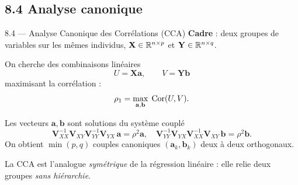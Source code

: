 \subsection{8.4 Analyse canonique}
\begin{frame}{8.4 — Analyse Canonique des Corrélations (CCA)}
\textbf{Cadre} : deux groupes de variables sur les mêmes individus,
$\mathbf{X} \in \mathbb{R}^{n \times p}$ et $\mathbf{Y} \in \mathbb{R}^{n \times q}$.

\begin{definition}
On cherche des combinaisons linéaires
\[
U = \mathbf{X}\mathbf{a}, \qquad V = \mathbf{Y}\mathbf{b}
\]
maximisant la \alert{corrélation} :
\[
\rho_1 = \max_{\mathbf{a}, \mathbf{b}}\; \operatorname{Cor}(U, V).
\]
\end{definition}

\begin{theorem}[Solution]
Les vecteurs $\mathbf{a}, \mathbf{b}$ sont solutions du système couplé
\[
\mathbf{V}_{XX}^{-1}\mathbf{V}_{XY}\mathbf{V}_{YY}^{-1}\mathbf{V}_{YX}\, \mathbf{a} = \rho^2 \mathbf{a},
\quad
\mathbf{V}_{YY}^{-1}\mathbf{V}_{YX}\mathbf{V}_{XX}^{-1}\mathbf{V}_{XY}\, \mathbf{b} = \rho^2 \mathbf{b}.
\]
On obtient $\min(p, q)$ couples canoniques $(\mathbf{a}_k, \mathbf{b}_k)$ deux à deux orthogonaux.
\end{theorem}

\begin{rema}
\small La CCA est l'analogue \emph{symétrique} de la régression linéaire : elle
relie deux groupes \emph{sans hiérarchie}.
\end{rema}
\end{frame}

